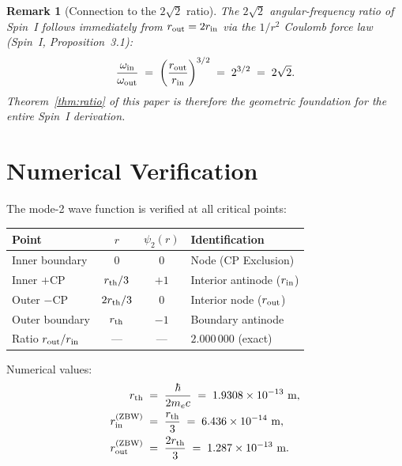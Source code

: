 \documentclass[12pt]{article}
\newtheorem{remark}[theorem]{Remark}
\newcommand{\rth}{r_{\rm th}}
\newcommand{\rin}{r_{\rm in}}
\newcommand{\rout}{r_{\rm out}}
\newcommand{\oin}{\omega_{\rm in}}
\newcommand{\oout}{\omega_{\rm out}}
\begin{document}
\begin{remark}[Connection to the $2\sqrt{2}$ ratio]
The $2\sqrt{2}$ angular-frequency ratio of Spin~I follows immediately
from $\rout = 2\rin$ via the $1/r^2$ Coulomb force law
(Spin~I, Proposition~3.1):
\begin{equation}
  \frac{\oin}{\oout} \;=\; \left(\frac{\rout}{\rin}\right)^{3/2}
  \;=\; 2^{3/2} \;=\; 2\sqrt{2}.
\end{equation}
Theorem~\ref{thm:ratio} of this paper is therefore the geometric
foundation for the entire Spin~I derivation.
\end{remark}

\section{Numerical Verification}
\label{sec:numerical}

The mode-2 wave function is verified at all critical points:

\begin{center}
\renewcommand{\arraystretch}{1.4}
\begin{tabular}{@{}lccl@{}}
\toprule
Point & $r$ & $\psi_2(r)$ & Identification \\
\midrule
Inner boundary  & $0$           & $0$   & Node (CP Exclusion) \\
Inner $+$CP     & $\rth/3$      & $+1$  & Interior antinode ($\rin$) \\
Outer $-$CP     & $2\rth/3$     & $0$   & Interior node ($\rout$) \\
Outer boundary  & $\rth$        & $-1$  & Boundary antinode \\
\midrule
Ratio $\rout/\rin$ & --- & --- & $2.000\,000$ (exact) \\
\bottomrule
\end{tabular}
\end{center}

Numerical values:
\begin{align}
  \rth   &\;=\; \frac{\hbar}{2m_e c}
  \;=\; 1.9308\times 10^{-13}\ \text{m}, \notag\\
  \rin^{\rm (ZBW)} &\;=\; \frac{\rth}{3}
  \;=\; 6.436\times 10^{-14}\ \text{m}, \notag\\
  \rout^{\rm (ZBW)} &\;=\; \frac{2\rth}{3}
  \;=\; 1.287\times 10^{-13}\ \text{m}.
  \label{eq:numerical}
\end{align}
\end{document}
